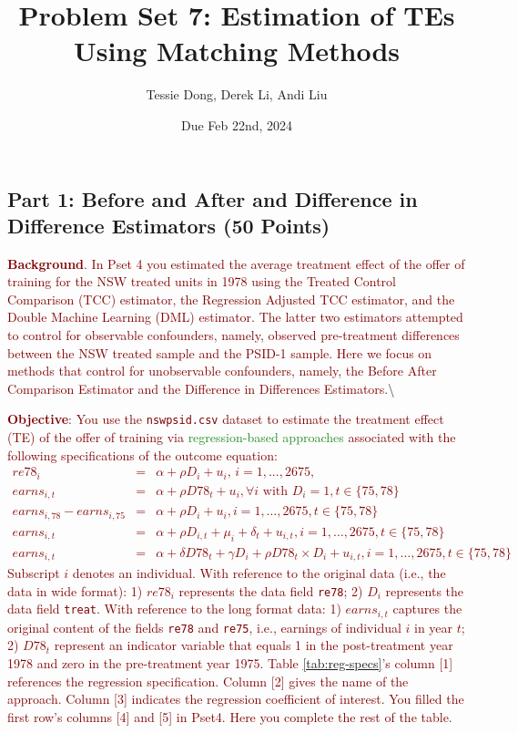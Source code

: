 \documentclass[
]{article}
\title{Problem Set 7: Estimation of TEs Using Matching Methods}
\author{Tessie Dong, Derek Li, Andi Liu}
\date{Due Feb 22nd, 2024}
\begin{document}
\maketitle

\hypertarget{part-1-before-and-after-and-difference-in-difference-estimators-50-points}{%
\subsection{Part 1: Before and After and Difference in Difference
Estimators (50
Points)}\label{part-1-before-and-after-and-difference-in-difference-estimators-50-points}}

\noindent \textcolor{Maroon}{\textbf{Background}. In Pset 4 you estimated the average treatment effect of the offer of training for the NSW treated units in 1978 using the  Treated Control Comparison (TCC) estimator, the Regression Adjusted TCC estimator, and the Double Machine Learning (DML) estimator. The latter two estimators attempted to control for observable confounders, namely, observed pre-treatment differences between the NSW treated sample and the PSID-1 sample. Here we focus on methods that control for unobservable confounders, namely, the Before After Comparison Estimator and the Difference in Differences Estimators.}\textbackslash{}

\noindent \textcolor{Maroon}{\textbf{Objective}: You use the \texttt{nswpsid.csv} dataset to estimate the treatment effect (TE) of the offer of training via \textcolor{ForestGreen}{regression-based approaches} associated with the following specifications of the outcome equation:
\begin{eqnarray}
re78_{i} &=&\alpha +\rho D_{i}+u_{i}\text{, }i=1,...,2675\text{,}
\label{TCcomp} \\
earns_{i,t} &=& \alpha + \rho D78_{t}+u_{i}, \forall i \text{ with } D_i=1, t \in \{75,78\}  \label{BAfter} \\
earns_{i,78}-earns_{i,75} &=& \alpha + \rho D_i + u_{i}, i=1,\ldots,2675, t \in \{75,78\}  \label{FD} \\
earns_{i,t} &=& \alpha + \rho D_{i,t}+ \mu_i + \delta_t + u_{i,t}, i=1,\ldots,2675, t \in \{75,78\}   \label{TWFE} \\
earns_{i,t} &=& \alpha + \delta {D78}_{t} + \gamma D_i + \rho {D78}_t \times D_i +  u_{i,t}, i=1,\ldots,2675, t \in \{75,78\}  \label{DinD} 
\end{eqnarray}
\noindent Subscript $i$ denotes an individual. With reference to the original data (i.e., the data in wide format): 1) $re78_{i}$ represents the data field \texttt{re78}; 2) $D_{i}$ represents the data field \texttt{treat}. With reference to the long format data: 1) $earns_{i,t}$ captures the original content of the fields \texttt{re78} and \texttt{re75}, i.e., earnings of individual $i$ in year $t$; 2) ${D78}_{t}$ represent an indicator variable that equals 1 in the post-treatment year 1978 and zero in the pre-treatment year 1975. Table \ref{tab:reg-specs}'s column [1] references the regression specification. Column [2] gives the name of the approach. Column [3] indicates the regression coefficient of interest. You filled the first row's columns [4] and [5] in Pset4. Here you complete the rest of the table.}
\end{document}
